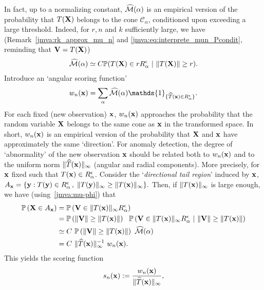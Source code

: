 In fact, up to a normalizing constant,  $\widehat{\mathcal{M}}(\alpha)$ is
an empirical version of the  probability that $T(\mathbf X)$ belongs
to the cone $\mathcal{C}_{\alpha}$, conditioned upon exceeding a large threshold. Indeed, for $r, n$ and $k$ sufficiently large, we have (Remark~\ref{jmva:rk_approx_mu_n} and \eqref{jmva:eq:interprete_mun_Pcondit}, reminding that $\mathbf V = T(\mathbf X)$) 
\begin{align*}
\widehat{\mathcal{M}}(\alpha)\simeq C \mathbb{P}(T(\mathbf X)\in r R_\alpha^\epsilon ~|~ \|T(\mathbf X)\|\ge
r) . 
\end{align*}
Introduce  an `angular scoring function'
\begin{align}\label{jmva:eq:angularscoring}
w_n(\mb x) = \sum_{\alpha }\hatmass(\alpha) \mathds{1}_{\{\widehat T(\mb x) \in R_\alpha^\epsilon\}}.
\end{align}
For each fixed (new observation) $\mathbf x$, $w_n(\mathbf x)$ approaches 
the probability that the random variable $\mathbf X$ belongs to the same cone
as $\mathbf x$ in the transformed space. In short,  $w_n(\mathbf x)$ is an
empirical version of the probability that  $\mathbf X$ and $\mathbf x$ have
approximately the  same `direction'. 
For anomaly detection, the degree of `abnormality' of the  new observation $\mathbf x$ %
should be related both to $w_n(\mathbf x)$ %
and to the uniform norm $\|\widehat T(\mathbf x)\|_\infty$ (angular and radial
components). More precisely, for $\mathbf x$ fixed such that
$T(\mathbf x)\in R_\alpha^\epsilon$.
Consider the  `\textit{directional tail region}' induced by $\mathbf x$, 
$A_{\mathbf x} =  \{ \mathbf y  : T(\mathbf y) \in R_\alpha^\epsilon\,,\;\|T(\mathbf y)\|_\infty \ge \| T(\mathbf x)\|_\infty\}.$
 Then, if  $\|T(\mathbf x)\|_\infty$ is large enough, we have (using~\eqref{jmva:mu-phi}) that 
\begin{align*}
\mathbb{P}\left( \mathbf X \in A_{\mathbf x} \right)  &= \mathbb{P}\left(\mathbf V\in \|T(\mathbf x)\|_\infty R_\alpha^\epsilon\right)\\
&= \mathbb{P}\left(\|\mathbf V\| \ge \|T(\mathbf x)\|\right) ~~ \mathbb{P}\left(\mathbf V\in \|T(\mathbf x)\|_\infty R_\alpha^\epsilon ~|~ \|\mathbf V\| \ge \|T(\mathbf x)\|\right) \\
&\simeq C~ \mathbb{P}\left(\|\mathbf V\| \ge \|T(\mathbf x)\|\right)~ \widehat{\mathcal{M}}(\alpha) \\
& =  C ~\|\widehat T(\mathbf x) \|_\infty^{-1} ~w_n(\mathbf x).
\end{align*}
 This yields the scoring function
\begin{align}
\label{jmva:def:scoring}
s_n(\mb x):=  \frac{w_n(\mb x)}{\|\widehat T(\mb x)\|_\infty}, %
\end{align}

